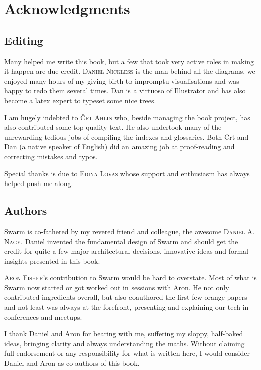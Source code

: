 \newcommand{\person}[1]{{\scshape #1}}
\chapter{Acknowledgments \statusgreen}

\section*{Editing}

Many helped me write this book, but a few that took very active roles in making it happen are due credit. \person{Daniel Nickless} is the man behind all the diagrams, we enjoyed many hours of my giving birth to impromptu visualisations and was happy to redo them several times. Dan is a virtuoso of Illustrator and has also become a latex expert to typeset some nice trees. 

I am hugely indebted to \person{Črt Ahlin} who, beside managing the book project, has also contributed some top quality text.
He also undertook many of the unrewarding tedious jobs of compiling the indexes and glossaries. Both Črt and Dan (a native speaker of English) did an amazing job at proof-reading and correcting mistakes and typos.

Special thanks is due to \person{Edina Lovas} whose support and enthusiasm has always helped push me along. 

\section*{Authors}

Swarm is co-fathered by my revered friend and colleague, the awesome \person{Daniel A. Nagy}.  Daniel invented the fundamental design of Swarm and should get the credit for quite a few major architectural decisions, innovative ideas and formal insights presented in this book. 

\person{Aron Fisher}'s contribution to Swarm would be hard to overstate. Most of what is Swarm now started or got worked out in sessions with Aron.  He not only contributed ingredients overall, but also coauthored the first few orange papers and not least was always at the forefront, presenting and explaining our tech in conferences and meetups.

I thank Daniel and Aron for bearing with me, suffering my sloppy, half-baked ideas, bringing clarity and always understanding the maths.
Without claiming full endorsement or any responsibility for what is written here,
I would consider Daniel and Aron as co-authors of this book.

